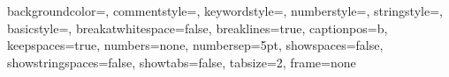 {
backgroundcolor=\color{backcolour},
commentstyle=\color{codegreen},
keywordstyle=\color{magenta},
numberstyle=\tiny\color{codegray},
stringstyle=\color{codepurple},
basicstyle=\ttfamily\footnotesize,
breakatwhitespace=false,
breaklines=true,
captionpos=b,
keepspaces=true,
numbers=none,
numbersep=5pt,
showspaces=false,
showstringspaces=false,
showtabs=false,
tabsize=2,
frame=none
}

\lstset{style=mystyle,language=C++}
